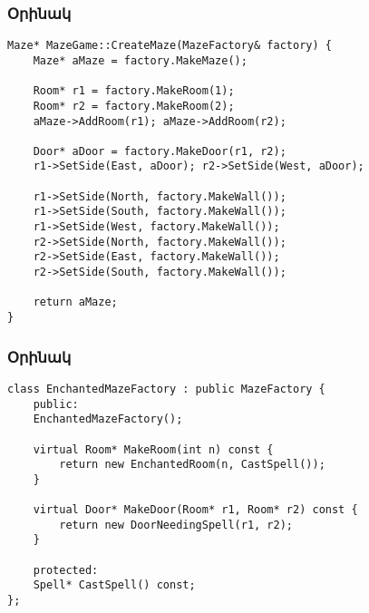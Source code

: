 \documentclass{beamer}
\begin{document}
\begin{frame}[fragile]\frametitle{Օրինակ}
\begin{english}
\begin{verbatim}
Maze* MazeGame::CreateMaze(MazeFactory& factory) {
    Maze* aMaze = factory.MakeMaze();

    Room* r1 = factory.MakeRoom(1);
    Room* r2 = factory.MakeRoom(2);
    aMaze->AddRoom(r1); aMaze->AddRoom(r2);

    Door* aDoor = factory.MakeDoor(r1, r2);
    r1->SetSide(East, aDoor); r2->SetSide(West, aDoor);

    r1->SetSide(North, factory.MakeWall());
    r1->SetSide(South, factory.MakeWall());
    r1->SetSide(West, factory.MakeWall());
    r2->SetSide(North, factory.MakeWall());
    r2->SetSide(East, factory.MakeWall());
    r2->SetSide(South, factory.MakeWall());

    return aMaze;
}
\end{verbatim}
\end{english}
\end{frame}

\begin{frame}[fragile]\frametitle{Օրինակ}
\begin{english}
\begin{verbatim}
class EnchantedMazeFactory : public MazeFactory {
    public:
    EnchantedMazeFactory();

    virtual Room* MakeRoom(int n) const {
        return new EnchantedRoom(n, CastSpell());
    }

    virtual Door* MakeDoor(Room* r1, Room* r2) const {
        return new DoorNeedingSpell(r1, r2);
    }

    protected:
    Spell* CastSpell() const;
};
\end{verbatim}
\end{english}
\end{frame}
\end{document}
